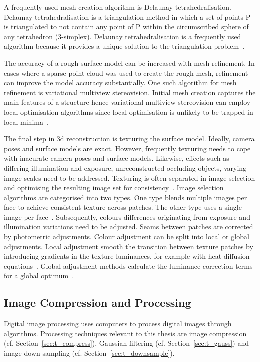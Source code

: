 A frequently used mesh creation algorithm is Delaunay tetrahedralisation. Delaunay tetrahedralisation is a triangulation method in which a set of points \gls{P} is triangulated to not contain any point of \gls{P} within the circumscribed sphere of any tetrahedron (3-simplex). Delaunay tetrahedralisation is a frequently used algorithm because it provides a unique solution to the triangulation problem~\cite{vu2012high}.

The accuracy of a rough surface model can be increased with mesh refinement. In cases where a sparse point cloud was used to create the rough mesh, refinement can improve the model accuracy substantially. One such algorithm for mesh refinement is variational multiview stereovision. Initial mesh creation captures the main features of a structure hence variational multiview stereovision can employ local optimisation algorithms since local optimisation is unlikely to be trapped in local minima~\cite{Faugeras1998VariationalProblem, vu2012high}.

The final step in \gls{3d} reconstruction is texturing the surface model. Ideally, camera poses and surface models are exact. However, frequently texturing needs to cope with inacurate camera poses and surface models. Likewise, effects such as differing illumination and exposure, unreconstructed occluding objects, varying image scales need to be addressed. Texturing is often separated in image selection and optimising the resulting image set for consistency~\cite{Waechter2014LetReconstructions}. Image selection algorithms are categorised into two types. One type blends multiple images per face to achieve consistent texture across patches. The other type uses a single image per face~\cite{Waechter2014LetReconstructions}.
Subsequently, colours differences originating from exposure and illumination variations need to be adjusted. Seams between patches are corrected by photometric adjustments. Colour adjustment can be split into local or global adjustments. Local adjustment smooth the transition between texture patches by introducing gradients in the texture luminances, for example with heat diffusion equations~\cite{Velho2007ProjectivePhotography}. Global adjustment methods calculate the luminance correction terms for a global optimum~\cite{Lempitsky2007SeamlessMaps}.

\subsection{Image Compression and Processing}
Digital image processing uses computers to process digital images through algorithms. Processing techniques relevant to this thesis are image compression (cf. Section~\ref{sec:t_compress}), Gaussian filtering  (cf. Section~\ref{sec:t_gauss}) and image down-sampling  (cf. Section~\ref{sec:t_downsample}).

